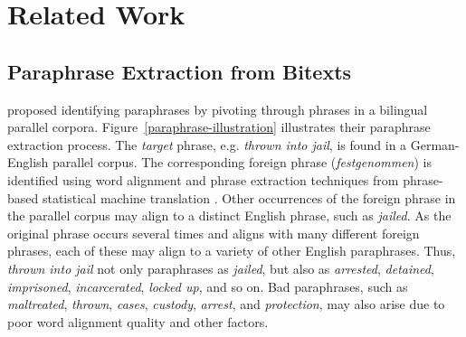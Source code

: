 \documentclass[11pt]{article}
\begin{document}


%


\section{Related Work}
\subsection{Paraphrase Extraction from Bitexts}

  proposed identifying paraphrases by pivoting through phrases in a bilingual parallel corpora. 
Figure~\ref{paraphrase-illustration} illustrates their paraphrase extraction process. The \emph{target} phrase, e.g. {\it thrown into jail}, is found in a German-English parallel corpus.  The corresponding foreign phrase ({\it festgenommen}) is identified using word alignment and phrase extraction techniques from phrase-based statistical machine translation \cite{KoehnEtAl03}.  Other occurrences of the foreign phrase in the parallel corpus may align to a distinct English phrase, such as {\it jailed}.  
%
As the original phrase occurs several times and aligns with many different foreign phrases, each of these may align to a variety of other English paraphrases.  Thus, {\it thrown into jail} not only paraphrases as {\it jailed}, but also as {\it arrested}, {\it detained}, {\it imprisoned}, {\it incarcerated}, {\it locked up}, and so on.
Bad paraphrases, such as
 {\it maltreated}, {\it thrown}, {\it cases}, {\it custody}, {\it arrest}, and {\it protection}, may also arise due to poor word alignment quality and other factors.
\end{document}

